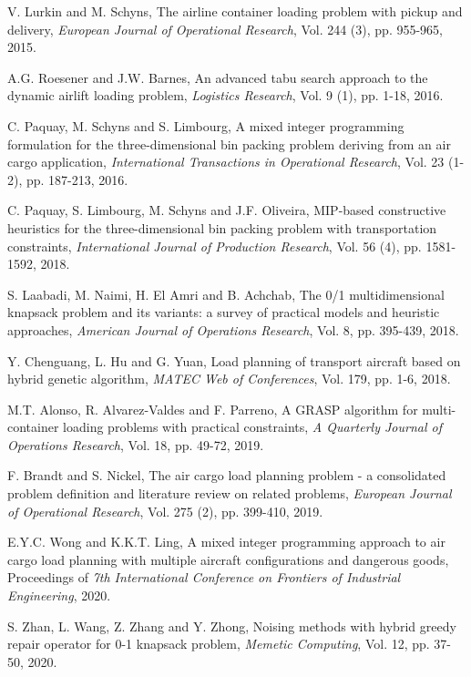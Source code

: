 \documentclass[preprint]{elsarticle}
\begin{document}
\begin{thebibliography}{00}
 V. Lurkin and M. Schyns, The airline container loading problem with pickup and delivery, {\it European Journal of Operational Research}, Vol. 244 (3), pp. 955-965, 2015.

 A.G. Roesener and J.W. Barnes, An advanced tabu search approach to the dynamic airlift loading problem, {\it Logistics Research}, Vol. 9 (1), pp. 1-18, 2016.

 C. Paquay, M. Schyns and S. Limbourg, A mixed integer programming formulation for the three-dimensional bin packing problem deriving from an air cargo application, {\it International Transactions in Operational Research}, Vol. 23 (1-2), pp. 187-213, 2016.

 C. Paquay, S. Limbourg, M. Schyns and J.F. Oliveira, MIP-based constructive heuristics for the three-dimensional bin packing problem with transportation constraints, {\it International Journal of Production Research},
Vol. 56 (4), pp. 1581-1592, 2018.

 S. Laabadi, M. Naimi, H. El Amri and B. Achchab, The 0/1 multidimensional knapsack problem and its variants: a survey of practical models and heuristic approaches, {\it American Journal of Operations Research}, Vol. 8, pp. 395-439, 2018.

 Y. Chenguang, L. Hu and G. Yuan, Load planning of transport aircraft based on hybrid genetic algorithm, {\it MATEC Web of Conferences}, Vol. 179, pp. 1-6, 2018.

 M.T. Alonso, R. Alvarez-Valdes and F. Parreno, A GRASP algorithm for multi-container loading problems with practical constraints, {\it A Quarterly Journal of Operations Research}, Vol. 18, pp. 49-72, 2019.

 F. Brandt and S. Nickel, The air cargo load planning problem - a consolidated problem definition and literature review on related problems, {\it European Journal of Operational Research}, Vol. 275 (2), pp. 399-410, 2019.

 E.Y.C. Wong and K.K.T. Ling, A mixed integer programming approach to air cargo load planning with multiple aircraft configurations and dangerous goods, Proceedings of {\it 7th International Conference on Frontiers of Industrial Engineering}, 2020.

 S. Zhan, L. Wang, Z. Zhang and Y. Zhong, Noising methods with hybrid greedy repair operator for 0-1 knapsack problem, {\it Memetic Computing}, Vol. 12, pp. 37-50, 2020.


\end{thebibliography}
\end{document}
